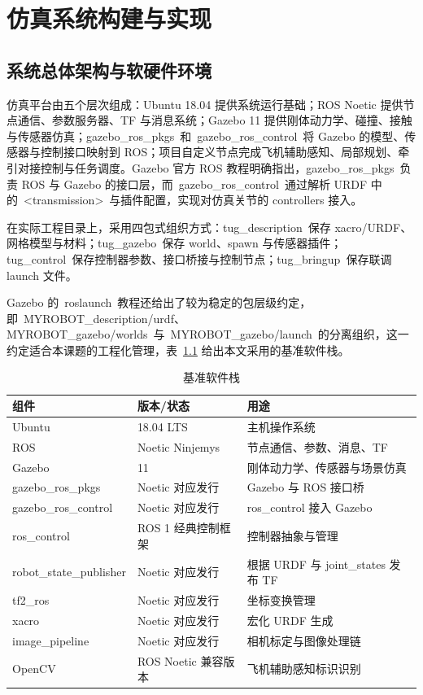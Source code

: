 \chapter{仿真系统构建与实现}

\section{系统总体架构与软硬件环境}

仿真平台由五个层次组成：Ubuntu 18.04 提供系统运行基础；ROS Noetic
提供节点通信、参数服务器、TF 与消息系统；Gazebo 11
提供刚体动力学、碰撞、接触与传感器仿真；gazebo\_ros\_pkgs~和~gazebo\_ros\_control~将
Gazebo 的模型、传感器与控制接口映射到
ROS；项目自定义节点完成飞机辅助感知、局部规划、牵引对接控制与任务调度\cite{ref11,ref12,ref13,ref16}。Gazebo
官方 ROS 教程明确指出，gazebo\_ros\_pkgs~负责 ROS 与 Gazebo
的接口层，而~gazebo\_ros\_control~通过解析 URDF
中的~\textless transmission\textgreater~与插件配置，实现对仿真关节的
controllers 接入\cite{ref13,ref16}。

在实际工程目录上，采用四包式组织方式：tug\_description~保存
xacro/URDF、网格模型与材料；tug\_gazebo~保存 world、spawn
与传感器插件；tug\_control~保存控制器参数、接口桥接与控制节点；tug\_bringup~保存联调
launch 文件。

Gazebo
的~roslaunch~教程还给出了较为稳定的包层级约定，即~MYROBOT\_description/urdf、MYROBOT\_gazebo/worlds~与~MYROBOT\_gazebo/launch~的分离组织，这一约定适合本课题的工程化管理\cite{ref11,ref12,ref13,ref14,ref15,ref16}，表~\ref{tab:software_stack} 给出本文采用的基准软件栈。

\begin{table}[H]
\centering
\caption{基准软件栈}
\label{tab:software_stack}
\footnotesize
\renewcommand{\arraystretch}{1.18}
\begin{tabularx}{\textwidth}{p{}p{}X}
\toprule
组件 & 版本/状态 & 用途 \\
\midrule
Ubuntu & 18.04 LTS & 主机操作系统 \\
ROS & Noetic Ninjemys & 节点通信、参数、消息、TF \\
Gazebo & 11 & 刚体动力学、传感器与场景仿真 \\
gazebo\_ros\_pkgs & Noetic 对应发行 & Gazebo 与 ROS 接口桥 \\
gazebo\_ros\_control & Noetic 对应发行 & ros\_control 接入 Gazebo \\
ros\_control & ROS 1 经典控制框架 & 控制器抽象与管理 \\
robot\_state\_publisher & Noetic 对应发行 & 根据 URDF 与 joint\_states 发布 TF \\
tf2\_ros & Noetic 对应发行 & 坐标变换管理 \\
xacro & Noetic 对应发行 & 宏化 URDF 生成 \\
image\_pipeline & Noetic 对应发行 & 相机标定与图像处理链 \\
OpenCV & ROS Noetic 兼容版本 & 飞机辅助感知标识识别 \\
\bottomrule
\end{tabularx}
\end{table}



